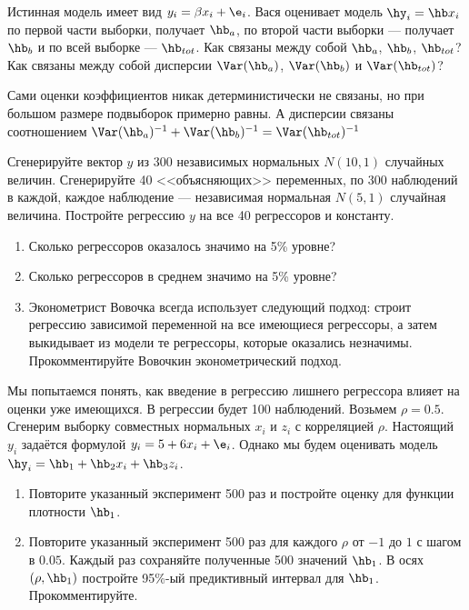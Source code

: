 \documentclass[pdftex,11pt,openany]{book}\usepackage[]{graphicx}\usepackage[]{color}
\begin{document}
\begin{problem}
 Истинная модель имеет вид $y_i=\beta x_i +\e_i$. Вася оценивает модель $\hy_i=\hb x_i$ по первой части выборки, получает $\hb_a$, по второй части выборки --- получает $\hb_b$ и по всей выборке --- $\hb_{tot}$. Как связаны между собой $\hb_{a}$, $\hb_{b}$, $\hb_{tot}$? Как связаны между собой дисперсии $\Var(\hb_a)$,  $\Var(\hb_b)$ и  $\Var(\hb_{tot})$?
\end{problem}

\begin{solution}
Сами оценки коэффициентов никак детерминистически не связаны, но при большом размере подвыборок примерно равны. А дисперсии связаны соотношением $\Var(\hb_a)^{-1}+\Var(\hb_b)^{-1}=\Var(\hb_{tot})^{-1}$ 
\end{solution}

\begin{problem}
 Сгенерируйте вектор $y$ из 300 независимых нормальных $N(10,1)$ случайных величин. Сгенерируйте 40 <<объясняющих>> переменных, по 300 наблюдений в каждой, каждое наблюдение --- независимая нормальная $N(5,1)$ случайная величина. Постройте регрессию $y$ на все 40 регрессоров и константу. 
\begin{enumerate}
\item Сколько регрессоров оказалось значимо на 5\% уровне?
\item Сколько регрессоров в среднем значимо на 5\% уровне?
\item Эконометрист Вовочка всегда использует следующий подход: строит регрессию зависимой переменной на все имеющиеся регрессоры, а затем выкидывает из модели те регрессоры, которые оказались незначимы. Прокомментируйте Вовочкин эконометрический подход.
\end{enumerate}
\end{problem}

\begin{solution}
\end{solution}


\begin{problem}
 Мы попытаемся понять, как введение в регрессию лишнего регрессора влияет на оценки уже имеющихся. В регрессии будет 100 наблюдений. Возьмем $\rho=0.5$. Сгенерим выборку совместных нормальных $x_i$ и $z_i$ с корреляцией $\rho$. Настоящий $y_i$ задаётся формулой $y_i=5+6x_i+\e_i$. Однако мы будем оценивать модель $\hy_i=\hb_1+\hb_2 x_i+\hb_3 z_i$.

\begin{enumerate}
\item Повторите указанный эксперимент 500 раз и постройте оценку для функции плотности $\hb_1$. 
\item Повторите указанный эксперимент 500 раз для каждого $\rho$ от $-1$ до $1$ с шагом в $0.05$. Каждый раз сохраняйте полученные 500 значений $\hb_1$. В осях $(\rho,\hb_1)$ постройте 95\%-ый предиктивный интервал для $\hb_1$. Прокомментируйте.
\end{enumerate}
\end{problem}
\end{document}

